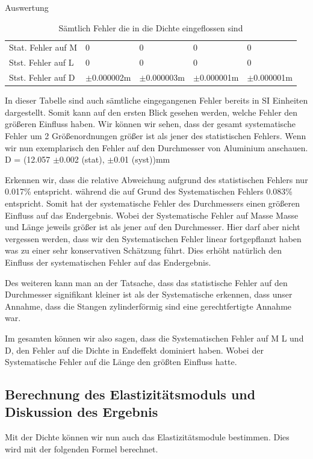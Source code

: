 \documentclass[twoside]{protokoll}
\begin{document}
\begin{aufgabe}{Auswertung}
\begin{table}[H]
\begin{tabularx}{1\textwidth}{l X X X X}
            \midrule
            Stat. Fehler auf M & 0 & 0 & 0 & 0 \\
            Stst. Fehler auf L & 0 & 0 & 0 & 0 \\
            Stst. Fehler auf D & $\pm$0.000002m & $\pm$0.000003m & $\pm$0.000001m & $\pm$0.000001m \\
           
            \bottomrule
        \end{tabularx}
        \caption{Sämtlich Fehler die in die Dichte eingeflossen sind}
        \label{tab:mytable}
    \end{table}

In dieser Tabelle sind auch sämtliche eingegangenen Fehler bereits in SI Einheiten dargestellt. Somit kann auf den ersten Blick gesehen werden, welche Fehler den größeren 
Einfluss haben. Wir können wir sehen, dass der gesamt systematische Fehler um 2 Größenordnungen größer ist als jener des statistischen Fehlers. Wenn wir nun exemplarisch den Fehler auf den Durchmesser von Aluminium anschauen.
 D = (12.057 $\pm$0.002 (stat), $\pm$0.01 (syst))mm 
 
Erkennen wir, dass die relative Abweichung aufgrund des statistischen 
Fehlers nur 0.017\% entspricht. während die auf Grund des Systematischen Fehlers
0.083\% entspricht. Somit hat der systematische Fehler des Durchmessers
einen größeren Einfluss auf das Endergebnis. Wobei der Systematische Fehler auf Masse 
Masse und Länge jeweils größer ist als jener auf den Durchmesser. 
Hier darf aber nicht vergessen werden, dass wir den Systematischen Fehler linear fortgepflanzt haben was zu einer sehr konservativen Schätzung führt. Dies erhöht 
natürlich den Einfluss der systematischen Fehler auf das Endergebnis. 

Des weiteren kann man an der Tatsache, dass das statistische Fehler auf den Durchmesser 
signifikant kleiner ist als der Systematische erkennen, dass unser Annahme, 
dass die Stangen zylinderförmig sind eine gerechtfertigte Annahme war. 

Im gesamten können wir also sagen, dass die Systematischen Fehler auf M L und D, den
Fehler auf die Dichte in Endeffekt dominiert haben. Wobei der Systematische Fehler auf
die Länge den größten Einfluss hatte.  

\subsection{Berechnung des Elastizitätsmoduls und Diskussion des Ergebnis}
Mit der Dichte können wir nun auch das Elastizitätsmodule bestimmen. Dies wird mit der folgenden Formel berechnet. 


\end{aufgabe}
\end{document}
